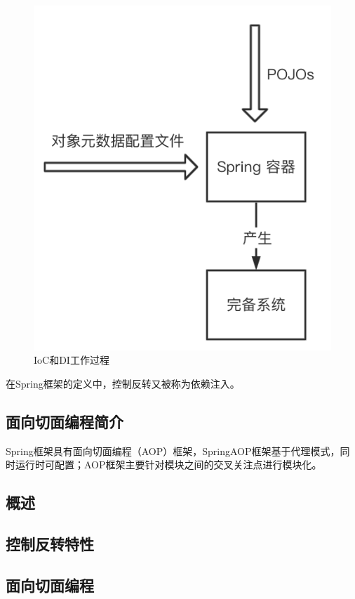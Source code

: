 \begin{figure}[ht]
    \centering
    \includegraphics[scale=.3]{./Figure/IMG_container.png}
    \caption{IoC和DI工作过程}\label{Fig:erd}
\end{figure}

在Spring框架的定义中，控制反转又被称为依赖注入。


\subsection{面向切面编程简介}
Spring框架具有面向切面编程（AOP）框架，SpringAOP框架基于代理模式，同时运行时可配置；AOP框架主要针对模块之间的交叉关注点进行模块化。


\subsection{概述}

\subsection{控制反转特性}

\subsection{面向切面编程}


